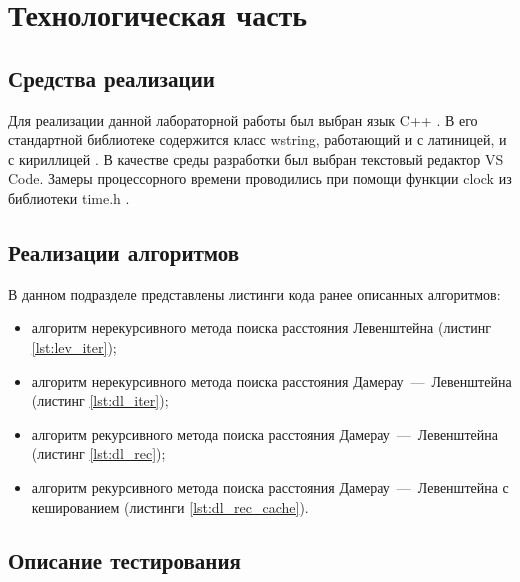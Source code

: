 \chapter{Технологическая часть}

\section{Средства реализации}

Для реализации данной лабораторной работы был выбран язык C++ \cite{c++}. В его стандартной библиотеке содержится класс wstring, работающий и с латиницей, и с кириллицей \cite{wstring}. В качестве среды разработки был выбран текстовый редактор VS Code. Замеры процессорного времени проводились при помощи функции clock из библиотеки time.h \cite{clock}.

\section{Реализации алгоритмов}

В данном подразделе представлены листинги кода ранее описанных алгоритмов:
\begin{itemize}[left=\parindent]
    \item алгоритм нерекурсивного метода поиска расстояния Левенштейна (листинг \ref{lst:lev_iter});
    \item алгоритм нерекурсивного метода поиска расстояния Дамерау~---~Левенштейна (листинг \ref{lst:dl_iter});
    \item алгоритм рекурсивного метода поиска расстояния Дамерау~---~Левенштейна (листинг \ref{lst:dl_rec});
    \item алгоритм рекурсивного метода поиска расстояния Дамерау~---~Левенштейна с кешированием  (листинги \ref{lst:dl_rec_cache}).
\end{itemize}


\section{Описание тестирования}

